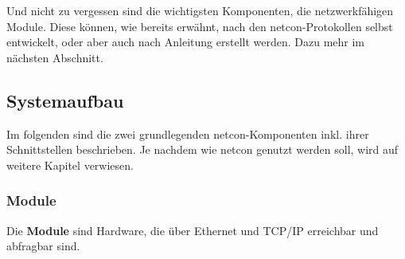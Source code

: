 \documentclass[a4paper,14pt,headsepline]{scrartcl}
\begin{document}
Und nicht zu vergessen sind die wichtigsten Komponenten, die netzwerkfähigen Module. Diese können, wie bereits erwähnt, nach den netcon-Protokollen selbst entwickelt, oder aber auch nach Anleitung erstellt werden. Dazu mehr im nächsten Abschnitt.
\newpage

\subsection{Systemaufbau}
Im folgenden sind die zwei grundlegenden netcon-Komponenten inkl. ihrer Schnittstellen beschrieben. Je nachdem wie netcon genutzt werden soll, wird auf weitere Kapitel verwiesen.

\subsubsection{Module}
Die \textbf{Module} sind Hardware, die über Ethernet und TCP/IP erreichbar und abfragbar sind. 

\begin{figure}[h]
\begin{center}
\end{center}
\end{figure}
\end{document}
